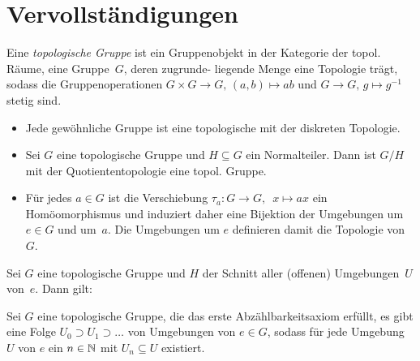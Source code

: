 \documentclass{cheat-sheet}
\newcommand{\clos}[1]{\overline{#1}} %
\begin{document}
\section{Vervollständigungen}



\begin{defn}
  Eine \emph{topologische Gruppe} ist ein Gruppenobjekt in der Kategorie der topol. Räume, \dh{} eine Gruppe~$G$, deren zugrunde- liegende Menge eine Topologie trägt, sodass die Gruppenoperationen $G \times G \to G, \, (a, b) \mapsto ab$ und $G \to G, \, g \mapsto g^{-1}$ stetig sind.
\end{defn}

\begin{bem}
  \begin{itemize}
    \item Jede gewöhnliche Gruppe ist eine topologische mit der diskreten Topologie.
    \item Sei $G$ eine topologische Gruppe und $H \subseteq G$ ein Normalteiler.
    Dann ist $G/H$ mit der Quotiententopologie eine topol. Gruppe.
    \item Für jedes $a \in G$ ist die Verschiebung $\tau_a : G \to G, \enspace x \mapsto ax$ ein Homöomorphismus und induziert daher eine Bijektion der Umgebungen um~$e \in G$ und um~$a$.
    Die Umgebungen um $e$ definieren damit die Topologie von~$G$.
  \end{itemize}
\end{bem}

\begin{lem}
  Sei $G$ eine topologische Gruppe und $H$ der Schnitt aller (offenen) Umgebungen~$U$ von~$e$.
  Dann gilt:
  \begin{itemize}
    \miniitem{0.4 \linewidth}{$H = \clos{\{ e \}}$}
  \end{itemize}
\end{lem}


\begin{voraussetzung}
  Sei $G$ eine topologische Gruppe, die das erste Abzählbarkeitsaxiom erfüllt, \dh{} es gibt eine Folge $U_0 \supset U_1 \supset \ldots$ von Umgebungen von $e \in G$, sodass für jede Umgebung $U$ von $e$ ein $n \in \mathbb{N}$ mit $U_n \subseteq U$ existiert.
\end{voraussetzung}
\end{document}
